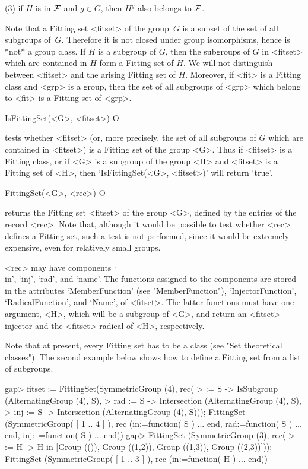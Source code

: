 \item{(3)} if $H$ is in $\cal F$ and $g \in G$, then $H^g$ also belongs to 
           $\cal F$.
\endlist

Note that a Fitting set <fitset> of the group~$G$ is a subset of the set of all
subgroups of~$G$. Therefore it is not closed under group
isomorphisms, hence  is *not* a group class. If $H$ is a subgroup of $G$, then the
subgroups of $G$ in <fitset> which are contained in $H$ form a Fitting set of $H$.
We will not distinguish between <fitset> and the arising Fitting set of $H$. 
Moreover, if  <fit> is a Fitting class and <grp> is a group, then the set of all
subgroups of <grp> which belong to <fit> is a Fitting set of <grp>.

\>IsFittingSet(<G>, <fitset>) O

tests whether <fitset> (or, more precisely, the set of all subgroups of $G$
which are contained in  <fitset>) is a Fitting set of the group <G>. Thus if
<fitset> is a Fitting class, or if
<G> is a subgroup of the group <H> and <fitset> is a Fitting set of <H>,
then `IsFittingSet(<G>, <fitset>)' will return `true'.

\>FittingSet(<G>, <rec>) O

returns the Fitting set <fitset> of the group <G>, defined by the entries of the
record <rec>. Note that, although it would be possible to test whether <rec> 
defines a Fitting set, such a test
is not performed, since it would be extremely expensive, even for relatively
small groups.

<rec> may have components `\\in', `inj', `rad', and `name'. The
functions assigned to the components are stored in the attributes
`MemberFunction' (see "MemberFunction"), `InjectorFunction', 
`RadicalFunction', and `Name', of <fitset>. The latter functions must have one
argument, <H>, which will be a subgroup of <G>, and return an <fitset>-injector
and the <fitset>-radical of <H>, respectively. 

Note that at present, every Fitting set has to be a class (see "Set theoretical
classes"). The second example below shows how to define a Fitting set from 
a list of subgroups.


\beginexample
gap>  fitset := FittingSet(SymmetricGroup (4), rec(
>        \in := S -> IsSubgroup (AlternatingGroup (4), S),
>        rad := S -> Intersection (AlternatingGroup (4), S),
>        inj := S -> Intersection (AlternatingGroup (4), S)));
FittingSet (SymmetricGroup( 
[ 1 .. 4 ] ), rec (in:=function( S ) ... end, rad:=function( S ) ... end, inj:\
=function( S ) ... end))
gap> FittingSet (SymmetricGroup (3), rec(
>       \in := H -> H in [Group (()), Group ((1,2)), Group ((1,3)), Group ((2,3))]));
FittingSet (SymmetricGroup( [ 1 .. 3 ] ), rec (in:=function( H ) ... end))
\endexample

